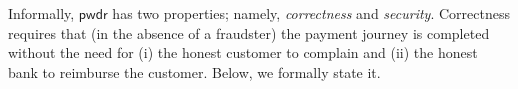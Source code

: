 





Informally, $\mathsf{pwdr}$ has two  properties; namely, \emph{correctness} and \emph{security}. Correctness requires that (in the absence of a fraudster) the payment journey is completed without the need for (i) the honest customer to complain and (ii)  the honest bank to reimburse the customer. Below, we formally state it.  


